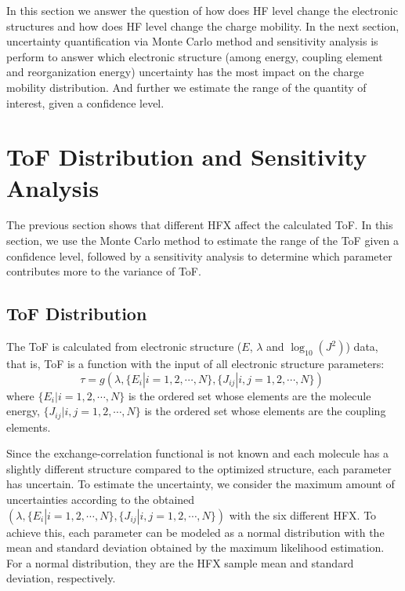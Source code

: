 \documentclass[letterpaper,12pt]{article}
\begin{document}
In this section we answer the question of how does HF level change the electronic structures and 
how does HF level change the charge mobility. 
In the next section, uncertainty quantification via Monte Carlo method and sensitivity analysis is perform to answer which electronic structure (among energy, coupling element and reorganization energy) uncertainty has the most impact on the charge mobility distribution. 
And further we estimate the range of the quantity of interest, given a confidence level.

\section{ToF Distribution and Sensitivity Analysis}
The previous section shows that different HFX affect the calculated ToF. In this section, we use the Monte Carlo method to estimate the range of the ToF given a confidence level, followed by a sensitivity analysis to determine which parameter contributes more to the variance of ToF. 

\subsection{ToF Distribution}
The ToF is calculated from electronic structure ($E$, $\lambda$ and $\log_{10}(J^2)$) data, that is, ToF is a function with the input of all electronic structure parameters:
\begin{equation}
    \tau = g(\lambda, \{E_i|i=1,2,\cdots,N \}, \{J_{ij}|i,j=1,2,\cdots,N \}) \;
\end{equation}
where $\{E_i|i=1,2,\cdots,N \}$ is the ordered set whose elements are the molecule energy,
$\{J_{ij}|i,j=1,2,\cdots,N \}$ is the ordered set whose elements are the coupling elements. 

Since the exchange-correlation functional is not known and each molecule has a slightly different structure compared to the optimized structure, each parameter has uncertain. 
To estimate the uncertainty, we consider the maximum amount of uncertainties according to the obtained $(\lambda, \{E_i|i=1,2,\cdots,N \}, \{J_{ij}|i,j=1,2,\cdots,N \})$ with the six different HFX.
To achieve this, each parameter can be modeled as a normal distribution with the mean and standard deviation obtained by the maximum likelihood estimation. For a normal distribution, they are the HFX sample mean and standard deviation, respectively.
\end{document}
